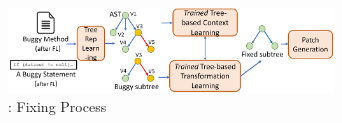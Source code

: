 
\begin{figure}[t]
	\centering
	\includegraphics[width=3.4in]{graphs/overview-predict.png}
	\caption{{\tool}: Fixing Process}
        \vspace{-3pt}
	\label{overview-fixing}
\end{figure}
